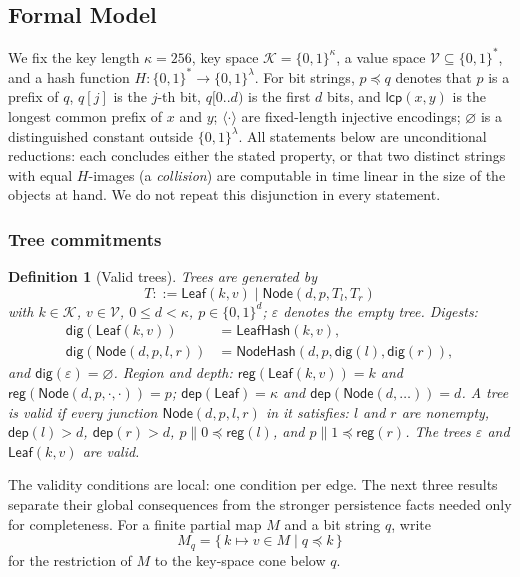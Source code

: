 \documentclass[11pt]{article}
\newtheorem{definition}{Definition}
\begin{document}
\subsection{Formal Model}
\label{sec:consistency-formal}

We fix the key length $\kappa = 256$, key space $\mathcal{K} = \{0,1\}^{\kappa}$, a value space $\mathcal{V} \subseteq \{0,1\}^{*}$, and a hash function $H \colon \{0,1\}^{*} \to \{0,1\}^{\lambda}$. For bit strings, $p \preceq q$ denotes that $p$ is a prefix of $q$, $q[j]$ is the $j$-th bit, $q[0..d)$ is the first $d$ bits, and $\mathsf{lcp}(x,y)$ is the longest common prefix of $x$ and $y$; $\langle\cdot\rangle$ are fixed-length injective encodings; $\varnothing$ is a distinguished constant outside $\{0,1\}^{\lambda}$. All statements below are unconditional reductions: each concludes either the stated property, or that two distinct strings with equal $H$-images (a \emph{collision}) are computable in time linear in the size of the objects at hand. We do not repeat this disjunction in every statement.

\subsubsection{Tree commitments}

\begin{definition}[Valid trees]
\label{def:tree}
Trees are generated by
\[ T ::= \mathsf{Leaf}(k, v) \mid \mathsf{Node}(d, p, T_l, T_r) \]
with $k \in \mathcal{K}$, $v \in \mathcal{V}$, $0 \le d < \kappa$, $p \in \{0,1\}^{d}$; $\varepsilon$ denotes the empty tree. Digests:
\begin{align*}
\mathsf{dig}(\mathsf{Leaf}(k,v)) &= \mathsf{LeafHash}(k,v),\\
\mathsf{dig}(\mathsf{Node}(d,p,l,r)) &= \mathsf{NodeHash}(d,p,\mathsf{dig}(l),\mathsf{dig}(r)),
\end{align*}
and $\mathsf{dig}(\varepsilon) = \varnothing$. Region and depth: $\mathsf{reg}(\mathsf{Leaf}(k,v)) = k$ and $\mathsf{reg}(\mathsf{Node}(d,p,\cdot,\cdot)) = p$; $\mathsf{dep}(\mathsf{Leaf}) = \kappa$ and $\mathsf{dep}(\mathsf{Node}(d,\ldots)) = d$. A tree is \emph{valid} if every junction $\mathsf{Node}(d,p,l,r)$ in it satisfies: $l$ and $r$ are nonempty, $\mathsf{dep}(l) > d$, $\mathsf{dep}(r) > d$, $p\|0 \preceq \mathsf{reg}(l)$, and $p\|1 \preceq \mathsf{reg}(r)$. The trees $\varepsilon$ and $\mathsf{Leaf}(k,v)$ are valid.
\end{definition}

The validity conditions are local: one condition per edge. The next three results separate their global consequences from the stronger persistence facts needed only for completeness. For a finite partial map $M$ and a bit string $q$, write
\[
  M_q = \{\,k \mapsto v \in M \mid q \preceq k\,\}
\]
for the restriction of $M$ to the key-space cone below $q$.
\end{document}
